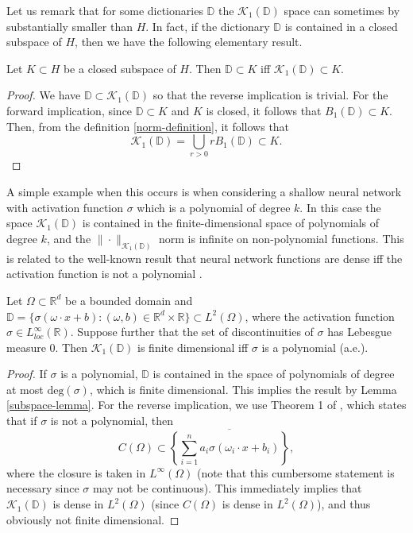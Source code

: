 Let us remark that for some dictionaries $\mathbb{D}$ the $\mathcal{K}_1(\mathbb{D})$ space can sometimes by substantially smaller than $H$. In fact, if the dictionary $\mathbb{D}$ is contained in a closed subspace of $H$, then we have the following elementary result.
\begin{lemma}\label{subspace-lemma}
 Let $K\subset H$ be a closed subspace of $H$. Then $\mathbb{D}\subset K$ iff $\mathcal{K}_1(\mathbb{D})\subset K$.
\end{lemma}
\begin{proof}
 We have $\mathbb{D}\subset\mathcal{K}_1(\mathbb{D})$ so that the reverse implication is trivial. For the forward implication, since $\mathbb{D}\subset K$ and $K$ is closed, it follows that $B_1(\mathbb{D})\subset K$. Then, from the definition \eqref{norm-definition}, it follows that
 \begin{equation}
  \mathcal{K}_1(\mathbb{D}) = \bigcup_{r > 0} rB_1(\mathbb{D})\subset K.
 \end{equation}

\end{proof}
 A simple example when this occurs is when considering a shallow neural network with activation function $\sigma$ which is a polynomial of degree $k$. In this case the space $\mathcal{K}_1(\mathbb{D})$ is contained in the finite-dimensional space of polynomials of degree $k$, and the $\|\cdot\|_{\mathcal{K}_1(\mathbb{D})}$ norm is infinite on non-polynomial functions. This is related to the well-known result that neural network functions are dense iff the activation function is not a polynomial \cite{leshno1993multilayer}. 
\begin{proposition}
 Let $\Omega\subset \mathbb{R}^d$ be a bounded domain and $\mathbb{D} = \{\sigma(\omega\cdot x + b):(\omega,b)\in \mathbb{R}^d\times \mathbb{R}\}\subset L^2(\Omega)$, where the activation function $\sigma\in L^\infty_{loc}(\mathbb{R})$. Suppose further that the set of discontinuities of $\sigma$ has Lebesgue measure $0$. Then $\mathcal{K}_1(\mathbb{D})$ is finite dimensional iff $\sigma$ is a polynomial (a.e.).
\end{proposition}
\begin{proof}
 If $\sigma$ is a polynomial, $\mathbb{D}$ is contained in the space of polynomials of degree at most $\text{deg}(\sigma)$, which is finite dimensional. This implies the result by Lemma \ref{subspace-lemma}. For the reverse implication, we use Theorem 1 of \cite{leshno1993multilayer}, which states that if $\sigma$ is not a polynomial, then 
 $$
 C(\Omega) \subset \overline{\left\{\sum_{i=1}^na_i\sigma(\omega_i\cdot x + b_i)\right\}},
 $$
 where the closure is taken in $L^\infty(\Omega)$ (note that this cumbersome statement is necessary since $\sigma$ may not be continuous). This immediately implies that $\mathcal{K}_1(\mathbb{D})$ is dense in $L^2(\Omega)$ (since $C(\Omega)$ is dense in $L^2(\Omega)$), and thus obviously not finite dimensional.
\end{proof}

